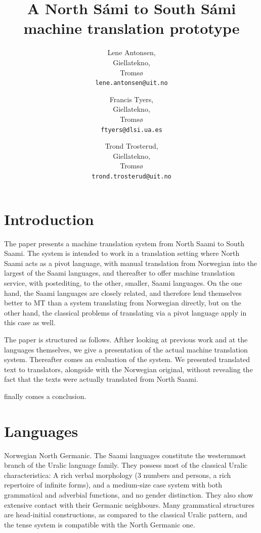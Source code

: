 \documentclass[a4paper,11pt,twocolumn]{article}
\title{A North Sámi to South Sámi machine translation prototype}
\author{Lene Antonsen,\\Giellatekno,\\Tromsø\\{\tt lene.antonsen@uit.no}
\and Francis Tyers,\\Giellatekno,\\Tromsø\\{\tt ftyers@dlsi.ua.es}
\and Trond Trosterud,\\Giellatekno,\\Tromsø\\{\tt trond.trosterud@uit.no}}
\date{}
\begin{document}
\maketitle

\section{Introduction}

The paper presents a machine translation system from North Saami to
South Saami. The system is intended to work in a translation setting
where North Saami acts as a pivot language, with manual translation
from Norwegian into the largest of the Saami languages, and thereafter
to offer machine translation service, with postediting, to the other,
smaller, Saami languages. On the one hand, the Saami languages are
closely related, and therefore lend themselves better to MT than a
system translating from Norwegian directly, but on the other hand, the
classical problems of translating via a pivot language apply in this
case as well. 

The paper is structured as follows. Afther looking at previous work
and at the languages themselves, we give a presentation of the actual
machine translation system. Thereafter comes an evaluation of the
system. We presented translated text to translators, alongside with
the Norwegian original, without revealing the fact that the texts were
actually translated from North Saami.

finally comes a conclusion.


\cite{tyers09} \cite{wiechetek10} \cite{trosterud12}


\section{Languages}

Norwegian North Germanic. The Saami languages constitute the
westernmost branch of the Uralic language family. They possess most of
the classical Uralic characteristica: A rich verbal morphology (3
numbers and persons, a rich repertoire of infinite forms), and a
medium-size case system with both grammatical and adverbial functions,
and no gender distinction. They also show extensive contact with their
Germanic neighbours. Many grammatical structures are head-initial
constructions, as compared to the classical Uralic pattern, and the
tense system is compatible with the North Germanic one.
\end{document}
